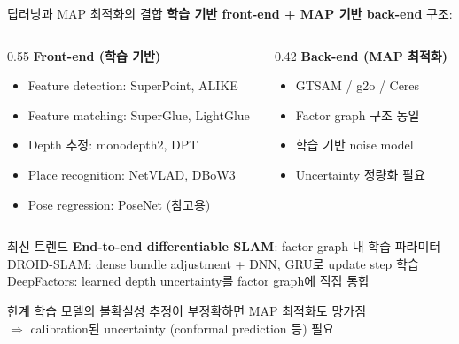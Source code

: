 \begin{frame}[shrink=20]{딥러닝과 MAP 최적화의 결합}
  \textbf{학습 기반 front-end + MAP 기반 back-end} 구조:
  \pause
  \begin{columns}[T]
    \begin{column}{0.55\textwidth}
      \textbf{Front-end (학습 기반)}
      \begin{itemize}
        \item Feature detection: SuperPoint, ALIKE
        \item Feature matching: SuperGlue, LightGlue
        \item Depth 추정: monodepth2, DPT
        \item Place recognition: NetVLAD, DBoW3
        \item Pose regression: PoseNet (참고용)
      \end{itemize}
    \end{column}
    \begin{column}{0.42\textwidth}
      \textbf{Back-end (MAP 최적화)}
      \begin{itemize}
        \item GTSAM / g2o / Ceres
        \item Factor graph 구조 동일
        \item 학습 기반 noise model
        \item Uncertainty 정량화 필요
      \end{itemize}
    \end{column}
  \end{columns}
  \pause
  \vspace{0.4em}
  \begin{block}{최신 트렌드}
    \textbf{End-to-end differentiable SLAM}: factor graph 내 학습 파라미터\\
    DROID-SLAM: dense bundle adjustment + DNN, GRU로 update step 학습\\
    DeepFactors: learned depth uncertainty를 factor graph에 직접 통합
  \end{block}
  \pause
  \begin{alertblock}{한계}
    학습 모델의 불확실성 추정이 부정확하면 MAP 최적화도 망가짐\\
    $\Rightarrow$ calibration된 uncertainty (conformal prediction 등) 필요
  \end{alertblock}
\end{frame}

